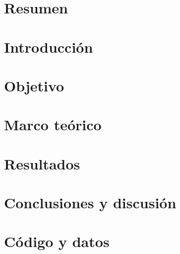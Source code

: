 \documentclass[12pt,letterpaper]{article}
\begin{document}

\tableofcontents
\pagebreak
\section{Resumen}

\section{Introducción}

\section{Objetivo}

\section{Marco teórico}

\section{Resultados}

\section{Conclusiones y discusión}

\section{Código y datos}



\end{document}
